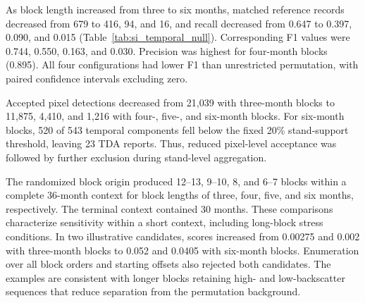 \documentclass[11pt,a4paper]{article}
\begin{document}
As block length increased from three to six months, matched reference records decreased from 679 to 416, 94, and 16, and recall decreased from 0.647 to 0.397, 0.090, and 0.015 (Table~\ref{tab:si_temporal_null}). Corresponding F1 values were 0.744, 0.550, 0.163, and 0.030. Precision was highest for four-month blocks (0.895). All four configurations had lower F1 than unrestricted permutation, with paired confidence intervals excluding zero.

Accepted pixel detections decreased from 21,039 with three-month blocks to 11,875, 4,410, and 1,216 with four-, five-, and six-month blocks. For six-month blocks, 520 of 543 temporal components fell below the fixed 20\% stand-support threshold, leaving 23 TDA reports. Thus, reduced pixel-level acceptance was followed by further exclusion during stand-level aggregation.

The randomized block origin produced 12--13, 9--10, 8, and 6--7 blocks within a complete 36-month context for block lengths of three, four, five, and six months, respectively. The terminal context contained 30 months. These comparisons characterize sensitivity within a short context, including long-block stress conditions. In two illustrative candidates, scores increased from 0.00275 and 0.002 with three-month blocks to 0.052 and 0.0405 with six-month blocks. Enumeration over all block orders and starting offsets also rejected both candidates. The examples are consistent with longer blocks retaining high- and low-backscatter sequences that reduce separation from the permutation background.
\end{document}
